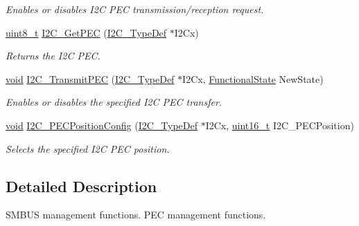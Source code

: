 \begin{DoxyCompactItemize}
\begin{DoxyCompactList}\small\item\em Enables or disables I2\-C P\-E\-C transmission/reception request. \end{DoxyCompactList}\item 
\hyperlink{stdint_8h_aba7bc1797add20fe3efdf37ced1182c5}{uint8\-\_\-t} \hyperlink{group___i2_c___group3_ga7bf75e7c27c0e1d73e70fc0e1c7cd1dd}{I2\-C\-\_\-\-Get\-P\-E\-C} (\hyperlink{struct_i2_c___type_def}{I2\-C\-\_\-\-Type\-Def} $\ast$I2\-Cx)
\begin{DoxyCompactList}\small\item\em Returns the I2\-C P\-E\-C. \end{DoxyCompactList}\item 
\hyperlink{group___n_a_m_e_ga18028b8badbf1ea7e704ccac3c488e82}{void} \hyperlink{group___i2_c___group3_gaa27d1440290fe601e730b6980999afe3}{I2\-C\-\_\-\-Transmit\-P\-E\-C} (\hyperlink{struct_i2_c___type_def}{I2\-C\-\_\-\-Type\-Def} $\ast$I2\-Cx, \hyperlink{group___exported__types_gac9a7e9a35d2513ec15c3b537aaa4fba1}{Functional\-State} New\-State)
\begin{DoxyCompactList}\small\item\em Enables or disables the specified I2\-C P\-E\-C transfer. \end{DoxyCompactList}\item 
\hyperlink{group___n_a_m_e_ga18028b8badbf1ea7e704ccac3c488e82}{void} \hyperlink{group___i2_c___group3_ga5d0f939bdd45542502827bf408f24161}{I2\-C\-\_\-\-P\-E\-C\-Position\-Config} (\hyperlink{struct_i2_c___type_def}{I2\-C\-\_\-\-Type\-Def} $\ast$I2\-Cx, \hyperlink{stdint_8h_a273cf69d639a59973b6019625df33e30}{uint16\-\_\-t} I2\-C\-\_\-\-P\-E\-C\-Position)
\begin{DoxyCompactList}\small\item\em Selects the specified I2\-C P\-E\-C position. \end{DoxyCompactList}\end{DoxyCompactItemize}


\subsection{Detailed Description}
S\-M\-B\-U\-S management functions. P\-E\-C management functions.

